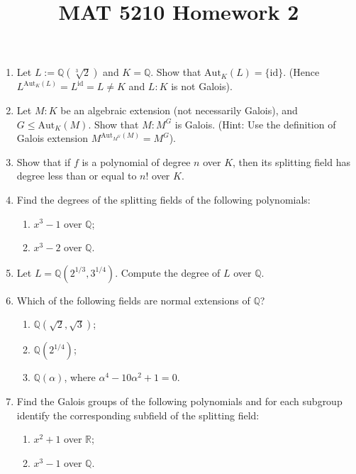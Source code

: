 \documentclass{article}
\title{MAT 5210 Homework 2}
\date{}
\begin{document}
\maketitle

\begin{enumerate}
    \item Let $L := \mathbb{Q}(\sqrt[3]{2})$ and $K = \mathbb{Q}$. Show that $\text{Aut}_K(L) = \{\text{id}\}$. (Hence $L^{\text{Aut}_K(L)} = L^{\text{id}} = L \neq K$ and $L: K$ is not Galois).

    \item Let $M: K$ be an algebraic extension (not necessarily Galois), and $G \leq \text{Aut}_K(M)$. Show that $M: M^G$ is Galois. (Hint: Use the definition of Galois extension $M^{\text{Aut}_{M^{G}}(M)} = M^G$).

    \item Show that if $f$ is a polynomial of degree $n$ over $K$, then its splitting field has degree less than or equal to $n!$ over $K$.

    \item Find the degrees of the splitting fields of the following polynomials:
    \begin{enumerate}
        \item $x^3 - 1$ over $\mathbb{Q}$;
        \item $x^3 - 2$ over $\mathbb{Q}$.
    \end{enumerate}

    \item Let $L = \mathbb{Q}\left(2^{1/3}, 3^{1/4}\right)$. Compute the degree of $L$ over $\mathbb{Q}$.

    \item Which of the following fields are normal extensions of $\mathbb{Q}$?
    \begin{enumerate}
        \item $\mathbb{Q}(\sqrt{2}, \sqrt{3})$;
        \item $\mathbb{Q}\left(2^{1/4}\right)$;
        \item $\mathbb{Q}(\alpha)$, where $\alpha^4 - 10\alpha^2 + 1 = 0$.
    \end{enumerate}

    \item Find the Galois groups of the following polynomials and for each subgroup identify the corresponding subfield of the splitting field:
    \begin{enumerate}
        \item $x^2 + 1$ over $\mathbb{R}$;
        \item $x^3 - 1$ over $\mathbb{Q}$.
    \end{enumerate}




\end{enumerate}
\end{document}
